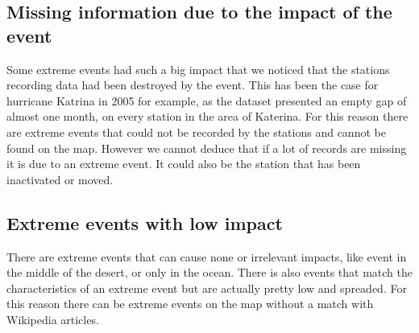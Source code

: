 \subsection{Missing information due to the impact of the event}
Some extreme events had such a big impact that we noticed that the stations recording data had been destroyed by the event. This has been the case for hurricane Katrina in 2005 for example, as the dataset presented an empty gap of almost  one month, on every station in the area of Katerina. For this reason there are extreme events that could not be recorded by the stations and cannot be found on the map. However we cannot deduce that if a lot of records are missing it is due to an extreme event. It could also be the station that has been inactivated or moved.

\subsection{Extreme events with low impact}
There are extreme events that can cause none or irrelevant impacts, like event in the middle of the desert, or only in the ocean. There is also events that match the characteristics of an extreme event but are actually pretty low and spreaded. For this reason there can be extreme events on the map without a match with Wikipedia articles.

